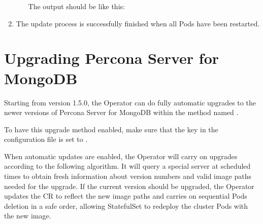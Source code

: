 \documentclass[letterpaper,10pt,english]{sphinxmanual}
\begin{document}
\begin{enumerate}
\begin{enumerate}
\begin{sphinxVerbatim}[commandchars=\\\{\}]
   
\end{sphinxVerbatim}

The output should be like this:

\begin{sphinxVerbatim}[commandchars=\\\{\}]
                              
                     
\end{sphinxVerbatim}

\end{enumerate}

\item {} 
The update process is successfully finished when all Pods have been
restarted.

\end{enumerate}


\section{Upgrading Percona Server for MongoDB}
\label{\detokenize{update:upgrading-percona-server-for-mongodb}}\label{\detokenize{update:operator-update-smartupdates}}
Starting from version 1.5.0, the Operator can do fully automatic upgrades to
the newer versions of Percona Server for MongoDB within the method named .

To have this upgrade method enabled, make sure that the  key
in the  configuration file is set to .

When automatic updates are enabled, the Operator will carry on upgrades
according to the following algorithm. It will query a special 
server at scheduled times to obtain fresh information about version numbers and
valid image paths needed for the upgrade. If the current version should be
upgraded, the Operator updates the CR to reflect the new image paths and carries
on sequential Pods deletion in a safe order, allowing StatefulSet to redeploy
the cluster Pods with the new image.
\end{document}
